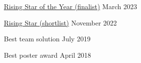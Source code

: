 \documentclass[12pt, a4paper]{article}
\begin{document}

%
          {\href{https://predatech.co.uk/british-data-awards-2023-finalists-announced/}%
                {Rising Star of the Year (finalist)}}%
          {March 2023}

%
          {\href{https://www.dynamonortheast.co.uk/dynamites22-shortlist-unveiled/}%
                {Rising Star (shortlist)}}%
          {November 2022}

%
          {Best team solution}%
          {July 2019}

%
          {Best poster award}%
          {April 2018}
\end{document}
